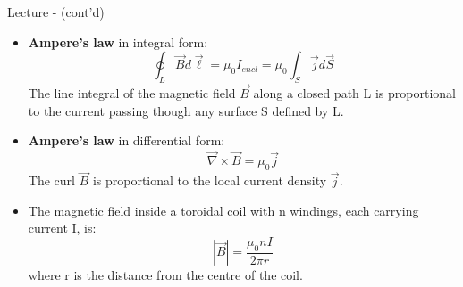 \begin{frame}{Lecture \summarizedlecture - \lecturesummarytitle (cont'd)}

\begin{itemize}

\item
    {\bf Ampere's law} in integral form:
     \begin{equation*}
        \oint_{L} \vec{B} d\vec{\ell} = \mu_0 I_{encl} = \mu_0 \int_{S} \vec{j} d\vec{S}
     \end{equation*}
     The line integral of the magnetic field $\vec{B}$ along a closed path L is proportional to the
     current passing though any surface S defined by L.

\vspace{0.2cm}

\item
    {\bf Ampere's law} in differential form:
    \begin{equation*}
       \vec{\nabla} \times \vec{B} = \mu_0 \vec{j}
    \end{equation*}
    The curl $\vec{B}$ is proportional to the local current density $\vec{j}$.

\vspace{0.2cm}

\item
    The magnetic field inside a toroidal coil with n windings, each carrying current I, is:
     \begin{equation*}
          |\vec{B}| = \frac{\mu_0 n I}{2\pi r}
     \end{equation*}
     where r is the distance from the centre of the coil.

\end{itemize}

\end{frame}

%
%
%

